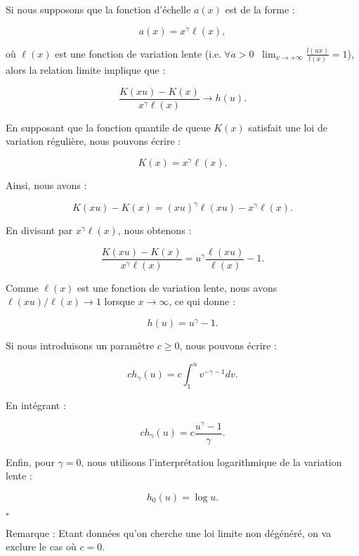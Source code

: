 \documentclass{article}
\begin{document}
Si nous supposons que la fonction d'échelle \( a(x) \) est de la forme :

\[
a(x) = x^\gamma \ell(x),
\]

où \( \ell(x) \) est une fonction de variation lente ($\text{i.e.} \; \forall a > 0 \; \; \lim_{x \to + \infty} \frac{l(ux)}{l(x)}=1$), alors la relation limite implique que :

\[
\frac{K(xu) - K(x)}{x^\gamma \ell(x)} \to h (u).
\]

En supposant que la fonction quantile de queue \( K(x) \) satisfait une loi de variation régulière, nous pouvons écrire :

\[
K(x) = x^\gamma \ell(x).
\]

Ainsi, nous avons :

\[
K(xu) - K(x) = (xu)^\gamma \ell(xu) - x^\gamma \ell(x).
\]

En divisant par \( x^\gamma \ell(x) \), nous obtenons :

\[
\frac{K(xu) - K(x)}{x^\gamma \ell(x)} = u^\gamma \frac{\ell(xu)}{\ell(x)} - 1.
\]

Comme \( \ell(x) \) est une fonction de variation lente, nous avons \( \ell(xu)/\ell(x) \to 1 \) lorsque \( x \to \infty \), ce qui donne :

\[
h (u) = u^\gamma - 1.
\]

Si nous introduisons un paramètre \( c \geq 0 \), nous pouvons écrire :

\[
ch_\gamma (u) = c \int_1^u v^{-\gamma - 1} dv.
\]

En intégrant :

\[
ch_\gamma (u) = c \frac{u^\gamma - 1}{\gamma}.
\]

Enfin, pour \( \gamma = 0 \), nous utilisons l'interprétation logarithmique de la variation lente :

\[
h_0 (u) = \log u.
\]

\hfill\(\square\)

Remarque : Etant données qu'on cherche une loi limite non dégénéré, on va exclure le cas où $c = 0$.
\end{document}
